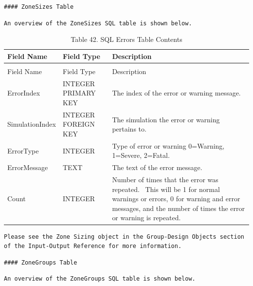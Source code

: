\begin{lstlisting}
#### ZoneSizes Table
\end{lstlisting}

\begin{lstlisting}
An overview of the ZoneSizes SQL table is shown below.
\end{lstlisting}

\begin{longtable}[c]{p{1.5in}p{1.5in}p{2.99in}}
\caption{Table 42. SQL Errors Table Contents \label{table:table-42.-sql-errors-table-contents}} \tabularnewline
\toprule 
Field Name & Field Type & Description \tabularnewline
\midrule
\endfirsthead

\caption[]{Table 42. SQL Errors Table Contents} \tabularnewline
\toprule 
Field Name & Field Type & Description \tabularnewline
\midrule
\endhead

ErrorIndex & INTEGER PRIMARY KEY & The index of the error or warning message. \tabularnewline
SimulationIndex & INTEGER FOREIGN KEY & The simulation the error or warning pertains to. \tabularnewline
ErrorType & INTEGER & Type of error or warning 0=Warning, 1=Severe, 2=Fatal. \tabularnewline
ErrorMessage & TEXT & The text of the error message. \tabularnewline
Count & INTEGER & Number of times that the error was repeated.~ This will be 1 for normal warnings or errors, 0 for warning and error messages, and the number of times the error or warning is repeated. \tabularnewline
\bottomrule
\end{longtable}

\begin{lstlisting}
Please see the Zone Sizing object in the Group-Design Objects section of the Input-Output Reference for more information.
\end{lstlisting}

\begin{lstlisting}
#### ZoneGroups Table
\end{lstlisting}

\begin{lstlisting}
An overview of the ZoneGroups SQL table is shown below.
\end{lstlisting}

